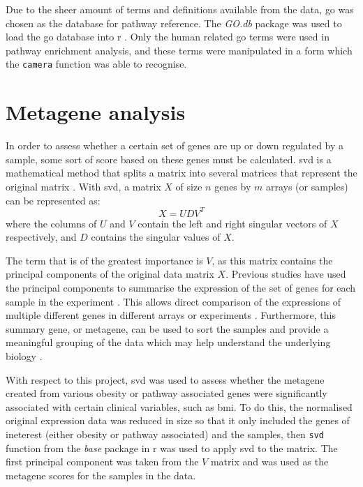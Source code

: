 Due to the sheer amount of terms and definitions available from the data, \gls{go} was chosen as the database for pathway reference.
The \textit{GO.db} package was used to load the \gls{go} database into \gls{r} \citep{Carlson2016}.
Only the human related \gls{go} terms were used in pathway enrichment analysis, and these terms were manipulated in a form which the \texttt{camera} function was able to recognise.

\section{Metagene analysis}
\label{sec:metagene_analysis}

In order to assess whether a certain set of genes are up or down regulated by a sample, some sort of score based on these genes must be calculated.
\Gls{svd} is a mathematical method that splits a matrix into several matrices that represent the original matrix \citep{Golub1970}.
With \gls{svd}, a matrix $X$ of size $n$ genes by $m$ arrays (or samples) can be represented as:
\begin{equation}
	\label{eq:svd}
	X = UDV^T
\end{equation}
where the columns of $U$ and $V$ contain the left and right singular vectors of $X$ respectively, and $D$ contains the singular values of $X$.

The term that is of the greatest importance is $V$, as this matrix contains the principal components of the original data matrix $X$.
Previous studies have used the principal components to summarise the expression of the set of genes for each sample in the experiment \citep{Alter2000,West2001}.
This allows direct comparison of the expressions of multiple different genes in different arrays or experiments \citep{Alter2000}.
Furthermore, this summary gene, or metagene, can be used to sort the samples and provide a meaningful grouping of the data which may help understand the underlying biology \citep{Alter2000}.

With respect to this project, \gls{svd} was used to assess whether the metagene created from various obesity or pathway associated genes were significantly associated with certain clinical variables, such as \gls{bmi}.
To do this, the normalised original expression data was reduced in size so that it only included the genes of ineterest (either obesity or pathway associated) and the samples, then \texttt{svd} function from the \textit{base} package in \gls{r} was used to apply \gls{svd} to the matrix.
The first principal component was taken from the $V$ matrix and was used as the metagene scores for the samples in the data.

